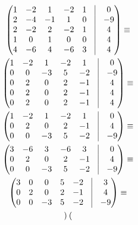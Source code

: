\documentclass[12pt, a4paper]{article}
\begin{document}
    \begin{multline} 
        \begin{pmatrix}
            1 & -2 & 1  & -2 & 1 & \vrule & 0  \\
            2 & -4 & -1 & 1  & 0 & \vrule & -9 \\
            2 & -2 & 2  & -2 & 1 & \vrule & 4 \\
            1 & 0  & 1  & 0  & 0 & \vrule & 4 \\
            4 & -6 & 4  & -6 & 3 & \vrule & 4 \\
        \end{pmatrix} \equiv \\ \begin{pmatrix}
            1 & -2 & 1 & -2 & 1 & \vrule & 0  \\
            0 & 0 & -3 & 5  & -2 & \vrule & -9 \\
            0 & 2 & 0  & 2 & -1 & \vrule & 4 \\
            0 & 2  & 0 & 2  & -1 & \vrule & 4 \\
            0 & 2 & 0  & 2 & -1 & \vrule & 4 \\
        \end{pmatrix} \equiv \\ \begin{pmatrix}
            1 & -2 & 1 & -2 & 1 & \vrule & 0  \\
            0 & 2 & 0  & 2 & -1 & \vrule & 4 \\
            0 & 0 & -3 & 5  & -2 & \vrule & -9 \\
        \end{pmatrix} \equiv \\ \begin{pmatrix}
            3 & -6 & 3 & -6 & 3 & \vrule & 0  \\
            0 & 2 & 0  & 2 & -1 & \vrule & 4 \\
            0 & 0 & -3 & 5  & -2 & \vrule & -9 \\
        \end{pmatrix} \equiv \\ \begin{pmatrix}
            3 & 0 & 0 & 5 & -2 & \vrule & 3 \\
            0 & 2 & 0  & 2 & -1 & \vrule & 4 \\
            0 & 0 & -3 & 5  & -2 & \vrule & -9 \\
        \end{pmatrix} \equiv \\ \begin{pmatrix}

\end{pmatrix}
\end{multline}
\end{document}
